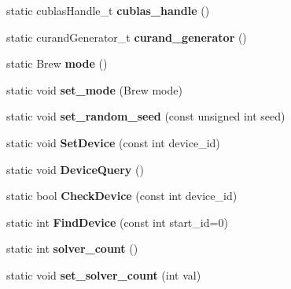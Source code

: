 \begin{DoxyCompactItemize}
static cublas\+Handle\+\_\+t {\bfseries cublas\+\_\+handle} ()
\item 
\mbox{\label{classcaffe_1_1_caffe_a659f92f48f20d95c46c6629574a26c0f}} 
static curand\+Generator\+\_\+t {\bfseries curand\+\_\+generator} ()
\item 
\mbox{\label{classcaffe_1_1_caffe_aa45214769b727ecd971e0d5ed8ffe96a}} 
static Brew {\bfseries mode} ()
\item 
\mbox{\label{classcaffe_1_1_caffe_a025008ff5854ba15e62138c81b7a140d}} 
static void {\bfseries set\+\_\+mode} (Brew mode)
\item 
\mbox{\label{classcaffe_1_1_caffe_a97f10f9bb79e2d8d5ccd6ba6f5d127b4}} 
static void {\bfseries set\+\_\+random\+\_\+seed} (const unsigned int seed)
\item 
\mbox{\label{classcaffe_1_1_caffe_ad1d32cc591f230e448e62bbfd91a5510}} 
static void {\bfseries Set\+Device} (const int device\+\_\+id)
\item 
\mbox{\label{classcaffe_1_1_caffe_ae5d9fb78572c71b463e10c5375ff4de9}} 
static void {\bfseries Device\+Query} ()
\item 
\mbox{\label{classcaffe_1_1_caffe_a36885ad76366f80c00a2a23d7823b06a}} 
static bool {\bfseries Check\+Device} (const int device\+\_\+id)
\item 
\mbox{\label{classcaffe_1_1_caffe_ab65de929dd1266f884c259725e31c629}} 
static int {\bfseries Find\+Device} (const int start\+\_\+id=0)
\item 
\mbox{\label{classcaffe_1_1_caffe_a69e125ae1d6bfa3618fa4d0418d97468}} 
static int {\bfseries solver\+\_\+count} ()
\item 
\mbox{\label{classcaffe_1_1_caffe_ae66753e0dd783b50bbc61c40c89a43f3}} 
static void {\bfseries set\+\_\+solver\+\_\+count} (int val)
\item 
\mbox{\label{classcaffe_1_1_caffe_abdd6522457e7ac94463d26408620f4c9}} 

\end{DoxyCompactItemize}

